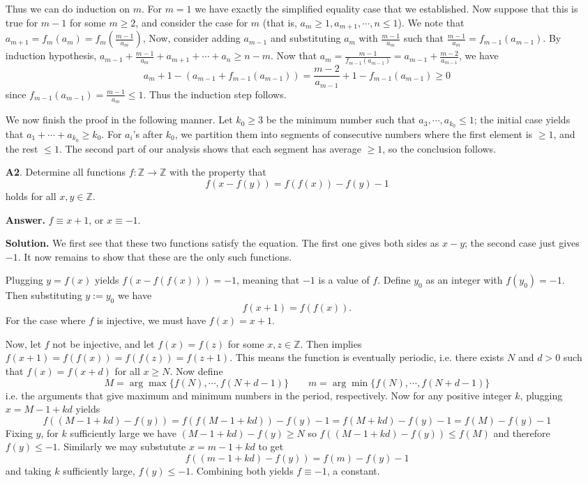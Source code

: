 \documentclass[11pt,a4paper]{article}
\begin{document}
\begin{enumerate}
Thus we can do induction on $m$. 
For $m = 1$ we have exactly the simplified equality case that we established. 
Now suppose that this is true for $m - 1$ for some $m\ge 2$, and consider the case for $m$ (that is, $a_{m}\ge 1, a_{m+1}, \cdots, n\le 1$). 
We note that $a_{m+1} = f_m(a_m) = f_m(\frac{m-1}{a_m})$, 
Now, consider adding $a_{m-1}$ and substituting $a_m$ with $\frac{m-1}{a_m}$ such that 
$\frac{m-1}{a_m} = f_{m-1}(a_{m-1})$. 
By induction hypothesis, 
$a_{m-1} + \frac{m-1}{a_m}  + a_{m+1} + \cdots + a_n \ge n - m$. 
Now that $a_m = \frac{m-1}{f_{m-1}(a_{m-1})} = a_{m-1} + \frac{m - 2}{a_{m-1}}$, 
we have 
\[a_m + 1 - (a_{m-1} + f_{m-1}(a_{m-1}))
= \frac{m - 2}{a_{m-1}} + 1 - f_{m-1}(a_{m-1})
\ge 0
\]
since $f_{m-1}(a_{m-1})  = \frac{m-1}{a_m}\le 1$. Thus the induction step follows. 

We now finish the proof in the following manner. 
Let $k_0\ge 3$ be the minimum number such that $a_3, \cdots, a_{k_0}\le 1$; 
the initial case yields that $a_1+\cdots + a_{k_0}\ge k_0$. 
For $a_i$'s after $k_0$, 
we partition them into segments of consecutive numbers where the first element is $\ge 1$, and the rest $\le 1$. 
The second part of our analysis shows that each segment has average $\ge 1$, so the conclusion follows. 

\item[\textbf{A2}.] Determine all functions $f:\mathbb{Z}\rightarrow\mathbb{Z}$ with the property that \[f(x-f(y))=f(f(x))-f(y)-1\]holds for all $x,y\in\mathbb{Z}$.

\textbf{Answer.} $f\equiv x+1$, or $x\equiv -1$. 

\textbf{Solution.}
We first see that these two functions satisfy the equation. The first one gives both sides as $x - y$; the second case just gives $-1$. 
It now remains to show that these are the only such functions. 

Plugging $y=f(x)$ yields $f(x-f(f(x)))=-1$, meaning that $-1$ is a value of $f$. 
Define $y_0$ as an integer with $f(y_0)=-1$. 
Then substituting $y := y_0$ we have 
\begin{equation}\label{eq:a2}
	f(x+1)=f(f(x)).
\end{equation} For the case where $f$ is injective, we must have $f(x)=x+1$. 

Now, let $f$ not be injective, and let $f(x)=f(z)$ for some $x,z\in\mathbb{Z}$. Then  implies $f(x+1)=f(f(x))=f(f(z))=f(z+1)$. This means the function is eventually periodic, i.e. there exists $N$ and $d>0$ such that $f(x)=f(x+d)$ for all $x\ge N$. 
Now define 
\[
M = \arg\max\{f(N), \cdots, f(N + d - 1)\}
\qquad 
m = \arg\min\{f(N), \cdots, f(N + d - 1)\}
\]
i.e. the arguments that give maximum and minimum numbers in the period, respectively. 
Now for any positive integer $k$, plugging $x = M - 1 + kd$ yields 
\[
f((M - 1 + kd) - f(y)) = f(f(M - 1 + kd)) - f(y) - 1 = f(M + kd) - f(y) - 1 = f(M) - f(y) - 1
\]
Fixing $y$, for $k$ sufficiently large we have $(M - 1 + kd) - f(y)\ge N$ so $f((M - 1 + kd) - f(y)) \le f(M)$ and therefore $f(y)\le -1$. 
Similarly we may substutute $x = m - 1 + kd$ to get 
\[
f((m - 1 + kd) - f(y)) =f(m) - f(y) - 1
\]
and taking $k$ sufficiently large, $f(y)\le -1$. Combining both yields $f\equiv -1$, a constant. 


\end{enumerate}
\end{document}
